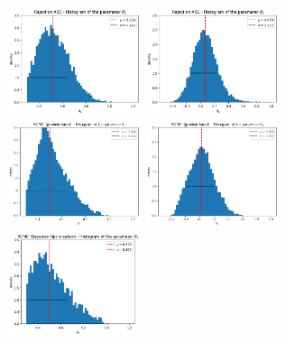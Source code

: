\begin{figure}[h]
    \begin{center}
      \includegraphics[width=0.35\textwidth]{./latex_files/images/chapter4/mae2_hist_t1_rejection.png}
      \includegraphics[width=0.35\textwidth]{./latex_files/images/chapter4/mae2_hist_t2_rejection.png}\\
      \includegraphics[width=0.35\textwidth]{./latex_files/images/chapter4/mae2_hist_t1_romc.png}
      \includegraphics[width=0.35\textwidth]{./latex_files/images/chapter4/mae2_hist_t2_romc.png}\\
      \includegraphics[width=0.35\textwidth]{./latex_files/images/chapter4/mae2_hist_t1_romc_bo.png}

\end{center}
\end{figure}
